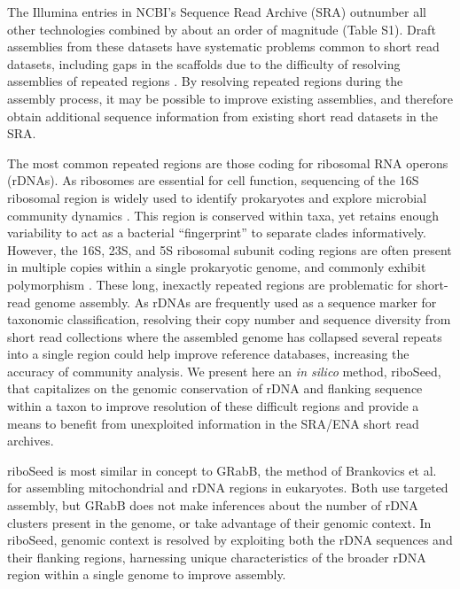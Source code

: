\documentclass[a4,center,fleqn]{NAR}
\begin{document}
The Illumina entries in NCBI's Sequence Read Archive (SRA) \cite{Kodama2012a} outnumber all other technologies combined by about an order of magnitude (Table S1). Draft assemblies from these datasets have systematic problems common to short read datasets, including gaps in the scaffolds due to the difficulty of resolving assemblies of repeated regions \cite{Whiteford2005,Treangen2011}. By resolving repeated regions during the assembly process, it may be possible to improve existing assemblies, and therefore obtain additional sequence information from existing short read datasets in the SRA.



The most common repeated regions are those coding for ribosomal RNA operons (rDNAs). As ribosomes are essential for cell function, sequencing of the 16S ribosomal region is widely used to identify prokaryotes and explore microbial community dynamics \cite{Weisburg1991,Clarridge2004,Woese1990,Case2007}. This region is conserved within taxa, yet retains enough variability to act as a bacterial ``fingerprint'' to separate clades informatively. However, the 16S, 23S, and 5S ribosomal subunit coding regions are often present in multiple copies within a single prokaryotic genome, and commonly exhibit polymorphism \cite{Coenye2003,Moreno2002,Lukjancenko2010,Vetrovsky2013}. These long, inexactly repeated regions \cite{Alkan2011} are problematic for short-read genome assembly. As rDNAs are frequently used as a sequence marker for taxonomic classification, resolving their copy number and sequence diversity from short read collections where the assembled genome has collapsed several repeats into a single region could help improve reference databases, increasing the accuracy of community analysis. We present here an \textit{in silico} method, riboSeed, that capitalizes on the genomic conservation of rDNA and flanking sequence within a taxon to improve resolution of these difficult regions and provide a means to benefit from unexploited information in the SRA/ENA short read archives.


riboSeed is most similar in concept to GRabB, the method of Brankovics et al. \cite{Brankovics2016} for assembling mitochondrial and rDNA regions in eukaryotes. Both use targeted assembly, but GRabB does not make inferences about the number of rDNA clusters present in the genome, or take advantage of their genomic context. In riboSeed, genomic context is resolved by exploiting both the rDNA sequences and their flanking regions, harnessing unique characteristics of the broader rDNA region within a single genome to improve assembly.
\end{document}
